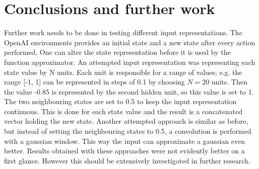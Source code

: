 
\section{Conclusions and further work}
Further work needs to be done in testing different input representations. The OpenAI environments provides an initial state and a new state after every action performed. One can alter the state representation before it is used by the function approximator. An attempted input representation was representing each state value by N units. Each unit is responsible for a range of values; e.g. the range [-1, 1] can be represented in steps of 0.1 by choosing $N=20$ units. Then the value -0.85 is represented by the second hidden unit, so this value is set to 1. The two neighbouring states are set to 0.5 to keep the input representation continuous. This is done for each state value and the result is a concatenated vector holding the new state. Another attempted approach is similar as before, but instead of setting the neighbouring states to 0.5, a convolution is performed with a gaussian window. This way the input can approximate a gaussian even better. Results obtained with these approaches were not evidently better on a first glance. However this should be extensively investigated in further research. 
